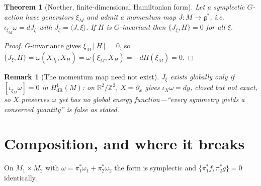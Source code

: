 \documentclass[12pt,a4paper]{article}
\theoremstyle{definition}
\theoremstyle{plain}
\newtheorem{theorem}[definition]{Theorem}
\theoremstyle{commentary}
\newtheorem{remark}[definition]{Remark}
\newcommand{\R}{\mathbb{R}}
\newcommand{\pb}[2]{\{#1,#2\}}
\begin{document}
\begin{theorem}[Noether, finite-dimensional Hamiltonian form]\label{thm:noether}
Let a symplectic $G$-action have generators $\xi_M$ and admit a momentum map $J:M\to\mathfrak{g}^*$,
i.e.\ $\iota_{\xi_M}\omega=dJ_\xi$ with $J_\xi=\langle J,\xi\rangle$. If $H$ is $G$-invariant then
$\pb{J_\xi}{H}=0$ for all $\xi$.
\end{theorem}
\begin{proof}
$G$-invariance gives $\xi_M[H]=0$, so
$\pb{J_\xi}{H}=\omega(X_{J_\xi},X_H)=\omega(\xi_M,X_H)=-dH(\xi_M)=0$.
\end{proof}

\begin{remark}[The momentum map need not exist]\label{rmk:equivariance}
$J_\xi$ exists globally only if $[\iota_{\xi_M}\omega]=0$ in $H^1_{\mathrm{dR}}(M)$: on
$\R^2/\mathbb{Z}^2$, $X=\partial_x$ gives $\iota_X\omega=dy$, closed but not exact, so $X$ preserves
$\omega$ yet has \emph{no global energy function}---``every symmetry yields a conserved quantity'' is
false as stated.
\end{remark}

\section{Composition, and where it breaks}
\label{sec:comp}

On $M_1\times M_2$ with $\omega=\pi_1^*\omega_1+\pi_2^*\omega_2$ the form is symplectic and
$\pb{\pi_1^*f}{\pi_2^*g}=0$ identically.
\end{document}
